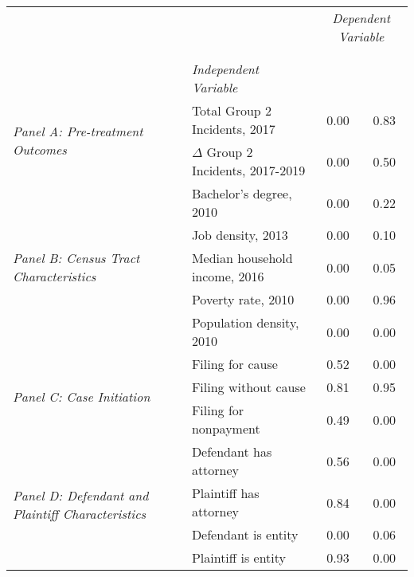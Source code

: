 \begin{tabular}{llcc}
\toprule
 &  & \multicolumn{2}{c}{\textit{Dependent Variable}} \\
\cline{3-4}
\\
 &  &  &  \\
 & \emph{Independent Variable} &  &  \\
\midrule
\multirow[c]{2}{3cm}{\textit{Panel A: Pre-treatment Outcomes}} & Total Group 2 Incidents, 2017 & 0.00 & 0.83 \\
 & $\Delta$ Group 2 Incidents, 2017-2019 & 0.00 & 0.50 \\
\cline{1-4}
\multirow[c]{5}{3cm}{\textit{Panel B: Census Tract Characteristics}} & Bachelor's degree, 2010 & 0.00 & 0.22 \\
 & Job density, 2013 & 0.00 & 0.10 \\
 & Median household income, 2016 & 0.00 & 0.05 \\
 & Poverty rate, 2010 & 0.00 & 0.96 \\
 & Population density, 2010 & 0.00 & 0.00 \\
\cline{1-4}
\multirow[c]{3}{3cm}{\textit{Panel C: Case Initiation}} & Filing for cause & 0.52 & 0.00 \\
 & Filing without cause & 0.81 & 0.95 \\
 & Filing for nonpayment & 0.49 & 0.00 \\
\cline{1-4}
\multirow[c]{4}{3cm}{\textit{Panel D: Defendant and Plaintiff Characteristics}} & Defendant has attorney & 0.56 & 0.00 \\
 & Plaintiff has attorney & 0.84 & 0.00 \\
 & Defendant is entity & 0.00 & 0.06 \\
 & Plaintiff is entity & 0.93 & 0.00 \\
\cline{1-4}
\bottomrule
\end{tabular}
